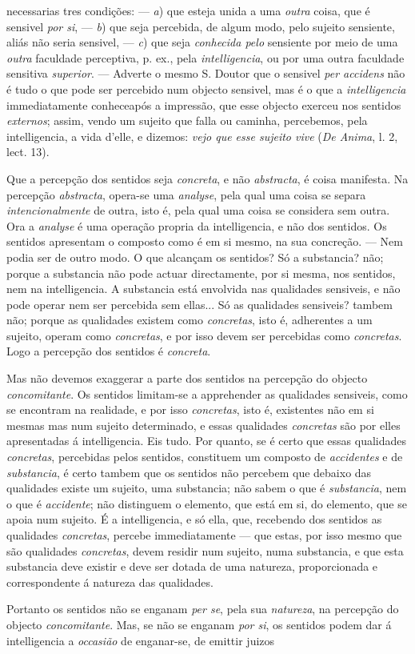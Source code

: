 necessarias tres condições: --- \emph{a}) que esteja unida a uma \emph{outra} coisa, que é sensivel \emph{por si}, --- \emph{b}) que seja percebida, de algum modo, pelo sujeito sensiente, aliás não seria sensivel, --- \emph{c}) que seja \emph{conhecida pelo} sensiente por meio de uma \emph{outra} faculdade perceptiva, p. ex., pela \emph{intelligencia}, ou por uma outra faculdade sensitiva \emph{superior}. --- Adverte o mesmo S. Doutor que o sensivel \emph{per accidens} não é tudo o que pode ser percebido num objecto sensivel, mas é o que a \emph{intelligencia} immediatamente conheceapós a impressão, que esse objecto exerceu nos sentidos \emph{externos}; assim, vendo um sujeito que falla ou caminha, percebemos, pela intelligencia, a vida d'elle, e dizemos: \emph{vejo que esse sujeito vive} (\emph{De Anima}, l. 2, lect. 13).\par Que a percepção dos sentidos seja \emph{concreta}, e não \emph{abstracta}, é coisa manifesta. Na percepção \emph{abstracta}, opera-se uma \emph{analyse}, pela qual uma coisa se separa \emph{intencionalmente} de outra, isto é, pela qual uma coisa se considera sem outra. Ora a \emph{analyse} é uma operação propria da intelligencia, e não dos sentidos. Os sentidos apresentam o composto como é em si mesmo, na sua concreção. --- Nem podia ser de outro modo. O que alcançam os sentidos? Só a substancia? não; porque a substancia não pode actuar directamente, por si mesma, nos sentidos, nem na intelligencia. A substancia está envolvida nas qualidades sensiveis, e não pode operar nem ser percebida sem ellas... Só as qualidades sensiveis? tambem não; porque as qualidades existem como \emph{concretas}, isto é, adherentes a um sujeito, operam como \emph{concretas}, e por isso devem ser percebidas como \emph{concretas}. Logo a percepção dos sentidos é \emph{concreta}.\par Mas não devemos exaggerar a parte dos sentidos na percepção do objecto \emph{concomitante}. Os sentidos limitam-se a apprehender as qualidades sensiveis, como se encontram na realidade, e por isso \emph{concretas}, isto é, existentes não em si mesmas mas num sujeito determinado, e essas qualidades \emph{concretas} são por elles apresentadas á intelligencia. Eis tudo. Por quanto, se é certo que essas qualidades \emph{concretas}, percebidas pelos sentidos, constituem um composto de \emph{accidentes} e de \emph{substancia}, é certo tambem que os sentidos não percebem que debaixo das qualidades existe um sujeito, uma substancia; não sabem o que é \emph{substancia}, nem o que é \emph{accidente}; não distinguem o elemento, que está em si, do elemento, que se apoia num sujeito. É a intelligencia, e só ella, que, recebendo dos sentidos as qualidades \emph{concretas}, percebe immediatamente --- que estas, por isso mesmo que são qualidades \emph{concretas}, devem residir num sujeito, numa substancia, e que esta substancia deve existir e deve ser dotada de uma natureza, proporcionada e correspondente á natureza das qualidades.\par Portanto os sentidos não se enganam \emph{per se}, pela sua \emph{natureza}, na percepção do objecto \emph{concomitante}. Mas, se não se enganam \emph{por si}, os sentidos podem dar á intelligencia a \emph{occasião} de enganar-se, de emittir juizos 